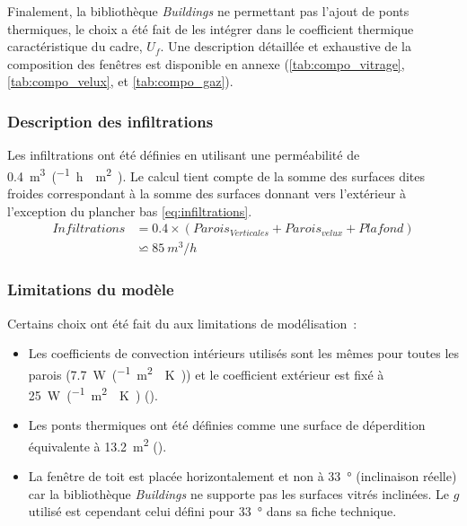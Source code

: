 Finalement, la bibliothèque \emph{Buildings} ne permettant pas l’ajout de ponts
thermiques, le choix a été fait de les intégrer dans le coefficient thermique
caractéristique du cadre, $U_{f}$. Une description détaillée et exhaustive de la
composition des fenêtres est disponible en annexe (\autoref{tab:compo_vitrage},
\autoref{tab:compo_velux}, et \autoref{tab:compo_gaz}).


\subsubsection{Description des infiltrations} %
\label{ssub:description_des_infiltrations}
Les infiltrations ont été définies en utilisant une perméabilité de
\SI{0.4}{m^{3}\per(\hour\period\meter\squared)}. Le calcul tient compte de la
somme des surfaces dites froides correspondant à la somme des surfaces donnant
vers l’extérieur à l’exception du plancher bas \eqref{eq:infiltrations}.
\begin{equation}
    \begin{aligned}
    Infiltrations &= \num{0.4} \times (Parois_{Verticales} + Parois_{velux} + Plafond)\\
    &              \backsimeq \SI{85}{m^{3}/h}
    \label{eq:infiltrations}
    \end{aligned}
\end{equation}



\subsubsection{Limitations du modèle} %
\label{ssub:limitations_du_modele}
Certains choix ont été fait du aux limitations de modélisation~:
\begin{itemize}
    \item Les coefficients de convection intérieurs utilisés sont les mêmes pour toutes
          les parois (\SI{7.7}{\watt\per(\meter\squared\period\kelvin)}) et le coefficient extérieur
          est fixé à \SI{25}{\watt\per(\meter\squared\period\kelvin)} (\textcite{NFENISO6946}).
    \item Les ponts thermiques ont été définies comme une surface de déperdition
          équivalente à \SI{13.2}{\meter\squared} ().
    \item La fenêtre de toit est placée horizontalement et non à \SI{33}{\degree}
          (inclinaison réelle) car la bibliothèque \emph{Buildings} ne supporte pas les
          surfaces vitrés inclinées. Le $g$ utilisé est cependant celui défini
          pour \SI{33}{\degree} dans sa fiche technique.
\end{itemize}


